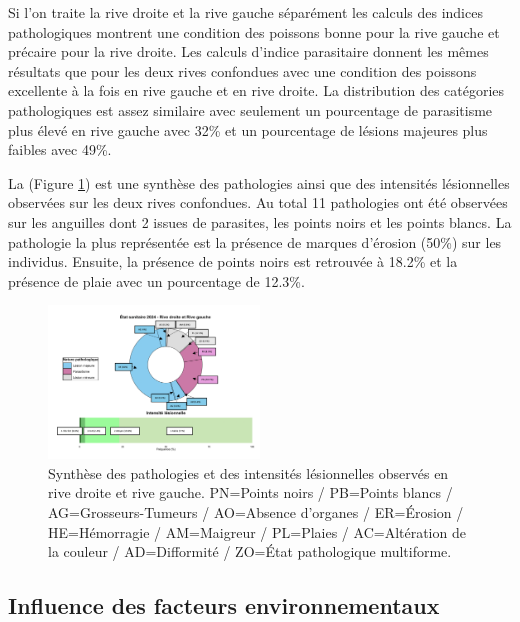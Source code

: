 \documentclass[11pt,titlepage,twoside]{article}\usepackage[]{graphicx}\usepackage[table]{xcolor}
\begin{document}
Si l’on traite la rive droite et la rive gauche séparément les calculs des indices pathologiques montrent une condition des poissons \og bonne \fg{} pour la rive gauche et \og précaire \fg{} pour la rive droite. Les calculs d’indice parasitaire donnent les mêmes résultats que pour les deux rives confondues avec une condition des poissons \og excellente \fg{} à la fois en rive gauche et en rive droite. La distribution des catégories pathologiques est assez similaire avec seulement un pourcentage de parasitisme plus élevé en rive gauche avec 32\% et un pourcentage de lésions majeures plus faibles avec 49\%. 

La (Figure \ref{patho}) est une synthèse des pathologies ainsi que des intensités lésionnelles observées sur les deux rives confondues. Au total 11 pathologies ont été observées sur les anguilles dont 2 issues de parasites, les points noirs et les points blancs. La pathologie la plus représentée est la présence de marques d’érosion (50\%) sur les individus. Ensuite, la présence de points noirs est retrouvée à 18.2\% et la présence de plaie avec un pourcentage de 12.3\%.

\begin{figure}[htpb]
\centering
\includegraphics[width=0.5\textwidth]{patho.png}
\caption{Synthèse des pathologies et des intensités lésionnelles observés en rive droite et rive gauche. PN=Points noirs / PB=Points blancs / AG=Grosseurs-Tumeurs / AO=Absence d’organes / ER=Érosion / HE=Hémorragie / AM=Maigreur / PL=Plaies / AC=Altération de la couleur / AD=Difformité / ZO=État pathologique multiforme.}
\label{patho}
\end{figure} 


\subsection{Influence des facteurs environnementaux }
\end{document}
